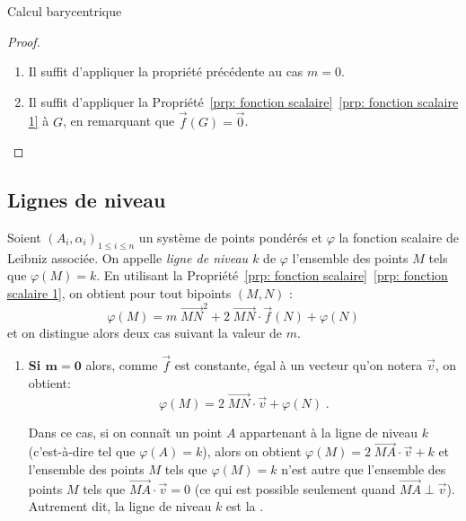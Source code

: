 \begin{chapter}{Calcul barycentrique}
\begin{prp}
\begin{proof}
\begin{enumerate}
\begin{align*}
                 & = \sum_{i = 1}^n \alpha_i \; {\overrightarrow{MN}}^2
                   + \sum_{i = 1}^n \alpha_i \; 2 \; \overrightarrow{MN} \cdot \overrightarrow{NA_i}
                   + \sum_{i = 1}^n \alpha_i \; {\overrightarrow{N A_i}}^2 \\
                 & = m \; {\overrightarrow{MN}}^2 + 2 \; \overrightarrow{MN} \cdot \vec{f}(N) + \varphi(N) \;.
      \end{align*}
\item Il suffit d'appliquer la propri\'et\'e pr\'ec\'edente au cas $m = 0$.      
\item Il suffit d'appliquer la Propri\'et\'e~\ref{prp: fonction scalaire}~\ref{prp: fonction scalaire 1} \`a $G$, en remarquant que $\vec{f}(G) = \vec{0}$.
\end{enumerate}
\end{proof}
\end{prp}
%
\subsection{Lignes de niveau}
%
Soient $(A_i , \alpha_i)_{1\leq i\leq n}$ un syst\`eme de points pond\'er\'es et $\varphi$ la fonction scalaire de Leibniz associ\'ee.
On appelle \emph{ligne de niveau $k$} de $\varphi$ l'ensemble des points $M$ tels que $\varphi(M) = k$.
En utilisant la Propri\'et\'e~\ref{prp: fonction scalaire}~\ref{prp: fonction scalaire 1}, on obtient pour tout bipoints $(M,N)$ :
\begin{displaymath}
\varphi(M) = m \; {\overrightarrow{MN}}^2 + 2 \; \overrightarrow{MN} \cdot \vec{f}(N) + \varphi(N)
\end{displaymath}
et on distingue alors deux cas suivant la valeur de $m$.
\begin{enumerate}
\item \textbf{Si $\mathbf{m = 0}$ }
      alors, comme $\vec{f}$ est constante, \'egal \`a un vecteur qu'on notera $\vec{v}$, on obtient: 
      $$
      \varphi (M) = 2 \; {\overrightarrow{MN}} \cdot \vec{v} + \varphi (N)
      \; .
      $$
      
      Dans ce cas, si on conna\^it un point $A$ appartenant \`a la ligne de niveau $k$ (c'est-\`a-dire tel que $\varphi (A) = k$),
      alors on obtient 
      $
      \varphi (M) = 2 \; \overrightarrow{MA} \cdot \vec{v} + k
      $
      et l'ensemble des points $M$ tels que $\varphi (M) = k$ n'est autre que l'ensemble des points $M$ tels que 
      $\overrightarrow{MA} \cdot \vec{v} = 0$ (ce qui est possible seulement quand $\overrightarrow{MA} \perp \vec{v}$). 
      Autrement dit, la ligne de niveau $k$ est la 
      .
      

\end{enumerate}
\end{chapter}
